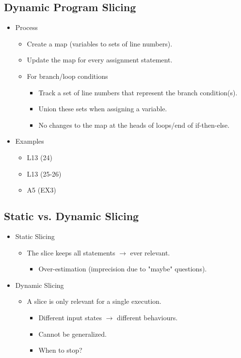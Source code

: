 \documentclass{article}
\begin{document}
\subsection{Dynamic Program Slicing}

\begin{itemize}
    \item Process
    \begin{itemize}
        \item Create a map (variables to sets of line numbers).
        \item Update the map for every assignment statement.
        \item For branch/loop conditions
        \begin{itemize}
            \item Track a set of line numbers that represent the branch condition(s).
            \item Union these sets when assigning a variable.
            \item No changes to the map at the heads of loops/end of if-then-else.
        \end{itemize}
    \end{itemize}
    \item Examples
    \begin{itemize}
        \item L13 (24)
        \item L13 (25-26)
        \item A5 (EX3)
    \end{itemize}
\end{itemize}

\subsection{Static vs. Dynamic Slicing}

\begin{itemize}
    \item Static Slicing
    \begin{itemize}
        \item The slice keeps all statements $\rightarrow$ ever relevant.
        \begin{itemize}
            \item Over-estimation (imprecision due to "maybe" questions).
        \end{itemize}
    \end{itemize}
    \item Dynamic Slicing
    \begin{itemize}
        \item A slice is only relevant for a single execution.
        \begin{itemize}
            \item Different input states $\rightarrow$ different behaviours.
            \item Cannot be generalized.
            \item When to stop?
        \end{itemize}
    \end{itemize}
\end{itemize}
\end{document}
